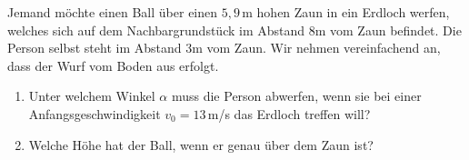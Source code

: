 \begin{ExerciseBlock}
Jemand möchte einen Ball über einen $5,9 \,$m hohen Zaun in ein Erdloch werfen, welches sich auf dem Nachbargrundstück im Abstand 8m vom Zaun befindet. Die Person selbst steht im Abstand 3m vom Zaun. Wir nehmen vereinfachend an, dass der Wurf vom Boden aus erfolgt.

\begin{center}
\end{center}

\begin{enumerate}
	\item Unter welchem Winkel $\alpha$ muss die Person abwerfen, wenn sie bei einer Anfangsgeschwindigkeit $v_0 = 13 \,$m/s das Erdloch treffen will?

	\item Welche Höhe hat der Ball, wenn er genau über dem Zaun ist?

\end{enumerate}
\end{ExerciseBlock}
